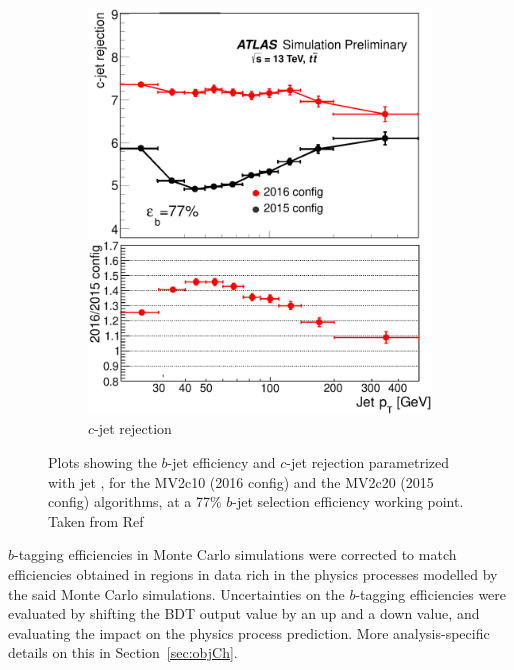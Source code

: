 \begin{figure}[!h]
\begin{subfigure}{0.5\textwidth}
   \includegraphics[width=\textwidth]{figures/bc0_modified4BIS_PRE.eps}
	\caption{$c$-jet rejection}
	\label{fig:refMV2}
\end{subfigure}
	\caption{Plots showing the $b$-jet efficiency and $c$-jet rejection parametrized with jet \pt, for the MV2c10 (2016 config)
and the MV2c20 (2015 config) algorithms, at a 77\% $b$-jet selection efficiency working 
point. Taken from Ref~~\cite{ATL-PHYS-PUB-2016-012}}
\end{figure}

\par $b$-tagging efficiencies in Monte Carlo simulations were corrected to match efficiencies obtained in 
regions in data rich in the physics processes modelled by the said Monte Carlo simulations. Uncertainties on the 
$b$-tagging efficiencies were evaluated by shifting the BDT output value by an up and a down value, and 
evaluating the impact on the physics process prediction. More analysis-specific details on this in 
Section~\ref{sec:objCh}. 
